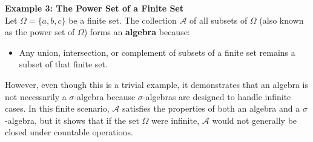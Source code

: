 \textbf{Example 3: The Power Set of a Finite Set} \\

Let $\Omega = \{a, b, c\}$ be a finite set. The collection $\mathcal{A}$ of all subsets of $\Omega$ (also known as the power set of $\Omega$) forms an \textbf{algebra} because:
\begin{itemize}
    \item Any union, intersection, or complement of subsets of a finite set remains a subset of that finite set.
\end{itemize}

However, even though this is a trivial example, it demonstrates that an algebra is not necessarily a $\sigma$-algebra because $\sigma$-algebras are designed to handle infinite cases. In this finite scenario, $\mathcal{A}$ satisfies the properties of both an algebra and a $\sigma$-algebra, but it shows that if the set $\Omega$ were infinite, $\mathcal{A}$ would not generally be closed under countable operations.


